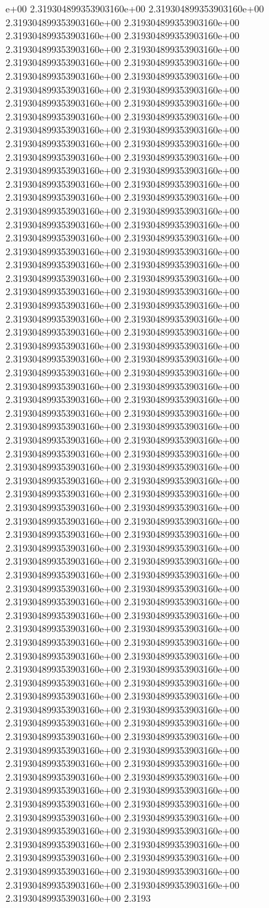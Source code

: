 e+00	2.319304899353903160e+00	2.319304899353903160e+00	2.319304899353903160e+00	2.319304899353903160e+00	2.319304899353903160e+00	2.319304899353903160e+00	2.319304899353903160e+00	2.319304899353903160e+00	2.319304899353903160e+00	2.319304899353903160e+00	2.319304899353903160e+00	2.319304899353903160e+00	2.319304899353903160e+00	2.319304899353903160e+00	2.319304899353903160e+00	2.319304899353903160e+00	2.319304899353903160e+00	2.319304899353903160e+00	2.319304899353903160e+00	2.319304899353903160e+00	2.319304899353903160e+00	2.319304899353903160e+00	2.319304899353903160e+00	2.319304899353903160e+00	2.319304899353903160e+00	2.319304899353903160e+00	2.319304899353903160e+00	2.319304899353903160e+00	2.319304899353903160e+00	2.319304899353903160e+00	2.319304899353903160e+00	2.319304899353903160e+00	2.319304899353903160e+00	2.319304899353903160e+00	2.319304899353903160e+00	2.319304899353903160e+00	2.319304899353903160e+00	2.319304899353903160e+00	2.319304899353903160e+00	2.319304899353903160e+00	2.319304899353903160e+00	2.319304899353903160e+00	2.319304899353903160e+00	2.319304899353903160e+00	2.319304899353903160e+00	2.319304899353903160e+00	2.319304899353903160e+00	2.319304899353903160e+00	2.319304899353903160e+00	2.319304899353903160e+00	2.319304899353903160e+00	2.319304899353903160e+00	2.319304899353903160e+00	2.319304899353903160e+00	2.319304899353903160e+00	2.319304899353903160e+00	2.319304899353903160e+00	2.319304899353903160e+00	2.319304899353903160e+00	2.319304899353903160e+00	2.319304899353903160e+00	2.319304899353903160e+00	2.319304899353903160e+00	2.319304899353903160e+00	2.319304899353903160e+00	2.319304899353903160e+00	2.319304899353903160e+00	2.319304899353903160e+00	2.319304899353903160e+00	2.319304899353903160e+00	2.319304899353903160e+00	2.319304899353903160e+00	2.319304899353903160e+00	2.319304899353903160e+00	2.319304899353903160e+00	2.319304899353903160e+00	2.319304899353903160e+00	2.319304899353903160e+00	2.319304899353903160e+00	2.319304899353903160e+00	2.319304899353903160e+00	2.319304899353903160e+00	2.319304899353903160e+00	2.319304899353903160e+00	2.319304899353903160e+00	2.319304899353903160e+00	2.319304899353903160e+00	2.319304899353903160e+00	2.319304899353903160e+00	2.319304899353903160e+00	2.319304899353903160e+00	2.319304899353903160e+00	2.319304899353903160e+00	2.319304899353903160e+00	2.319304899353903160e+00	2.319304899353903160e+00	2.319304899353903160e+00	2.319304899353903160e+00	2.319304899353903160e+00	2.319304899353903160e+00	2.319304899353903160e+00	2.319304899353903160e+00	2.319304899353903160e+00	2.319304899353903160e+00	2.319304899353903160e+00	2.319304899353903160e+00	2.319304899353903160e+00	2.319304899353903160e+00	2.319304899353903160e+00	2.319304899353903160e+00	2.319304899353903160e+00	2.319304899353903160e+00	2.319304899353903160e+00	2.319304899353903160e+00	2.319304899353903160e+00	2.319304899353903160e+00	2.319304899353903160e+00	2.319304899353903160e+00	2.319304899353903160e+00	2.319304899353903160e+00	2.319304899353903160e+00	2.319304899353903160e+00	2.319304899353903160e+00	2.319304899353903160e+00	2.319304899353903160e+00	2.319304899353903160e+00	2.319304899353903160e+00	2.319304899353903160e+00	2.319304899353903160e+00	2.319304899353903160e+00	2.319304899353903160e+00	2.319304899353903160e+00	2.319304899353903160e+00	2.3193